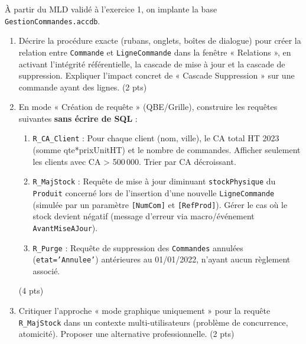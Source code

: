 \documentclass[11pt]{article}
\begin{document}
\begin{exercice}
À partir du MLD validé à l'exercice 1, on implante la base \texttt{GestionCommandes.accdb}.
\begin{enumerate}
    \item Décrire la procédure exacte (rubans, onglets, boîtes de dialogue) pour créer la relation entre \texttt{Commande} et \texttt{LigneCommande} dans la fenêtre « Relations », en activant l'intégrité référentielle, la cascade de mise à jour et la cascade de suppression. Expliquer l'impact concret de « Cascade Suppression » sur une commande ayant des lignes. (2 pts)
    \item En mode « Création de requête » (QBE/Grille), construire les requêtes suivantes \textbf{sans écrire de SQL} :
    \begin{enumerate}
        \item \texttt{R\_CA\_Client} : Pour chaque client (nom, ville), le CA total HT 2023 (somme qte*prixUnitHT) et le nombre de commandes. Afficher seulement les clients avec CA > 500\,000. Trier par CA décroissant.
        \item \texttt{R\_MajStock} : Requête de mise à jour diminuant \texttt{stockPhysique} du \texttt{Produit} concerné lors de l'insertion d'une nouvelle \texttt{LigneCommande} (simulée par un paramètre \texttt{[NumCom]} et \texttt{[RefProd]}). Gérer le cas où le stock devient négatif (message d'erreur via macro/événement \texttt{AvantMiseAJour}).
        \item \texttt{R\_Purge} : Requête de suppression des \texttt{Commandes} annulées (\texttt{etat='Annulee'}) antérieures au 01/01/2022, n'ayant aucun règlement associé.
    \end{enumerate}
    (4 pts)
    \item Critiquer l'approche « mode graphique uniquement » pour la requête \texttt{R\_MajStock} dans un contexte multi-utilisateurs (problème de concurrence, atomicité). Proposer une alternative professionnelle. (2 pts)
\end{enumerate}
\end{exercice}
\end{document}
